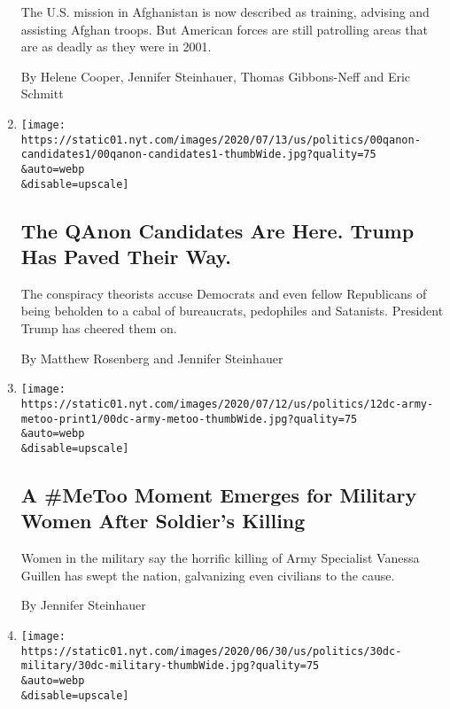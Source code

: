 \begin{enumerate}
  The U.S. mission in Afghanistan is now described as training, advising
  and assisting Afghan troops. But American forces are still patrolling
  areas that are as deadly as they were in 2001.

  By Helene Cooper, Jennifer Steinhauer, Thomas Gibbons-Neff and Eric
  Schmitt
\item
  \href{/2020/07/14/us/politics/qanon-politicians-candidates.html}{}

  \texttt{[image: https://static01.nyt.com/images/2020/07/13/us/politics/00qanon-candidates1/00qanon-candidates1-thumbWide.jpg?quality=75\\\&auto=webp\\\&disable=upscale]}

  \hypertarget{the-qanon-candidates-are-here-trump-has-paved-their-way}{%
  \subsection{The QAnon Candidates Are Here. Trump Has Paved Their
  Way.}\label{the-qanon-candidates-are-here-trump-has-paved-their-way}}

  The conspiracy theorists accuse Democrats and even fellow Republicans
  of being beholden to a cabal of bureaucrats, pedophiles and Satanists.
  President Trump has cheered them on.

  By Matthew Rosenberg and Jennifer Steinhauer
\item
  \href{/2020/07/11/us/politics/military-women-metoo-fort-hood.html}{}

  \texttt{[image: https://static01.nyt.com/images/2020/07/12/us/politics/12dc-army-metoo-print1/00dc-army-metoo-thumbWide.jpg?quality=75\\\&auto=webp\\\&disable=upscale]}

  \hypertarget{a-metoo-moment-emerges-for-military-women-after-soldiers-killing}{%
  \subsection{A \#MeToo Moment Emerges for Military Women After
  Soldier's
  Killing}\label{a-metoo-moment-emerges-for-military-women-after-soldiers-killing}}

  Women in the military say the horrific killing of Army Specialist
  Vanessa Guillen has swept the nation, galvanizing even civilians to
  the cause.

  By Jennifer Steinhauer
\item
  \href{/2020/06/30/us/politics/russia-taliban-afghanistan-bounty.html}{}

  \texttt{[image: https://static01.nyt.com/images/2020/06/30/us/politics/30dc-military/30dc-military-thumbWide.jpg?quality=75\\\&auto=webp\\\&disable=upscale]}


\end{enumerate}
